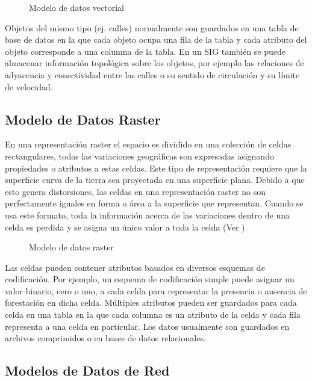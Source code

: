 \begin{figure}[h]
	\centering
	
	\caption{Modelo de datos vectorial}
	\label{fig:modelo-vectorial} 
\end{figure}

Objetos del mismo tipo (ej. calles) normalmente son guardados en una tabla de base de datos en la que cada objeto ocupa una fila de la tabla y cada atributo del objeto corresponde a una columna de la tabla. En un SIG también se puede almacenar información topológica sobre los objetos, por ejemplo las relaciones de adyacencia y conectividad entre las calles o su sentido de circulación y su límite de velocidad.

\subsection{Modelo de Datos Raster}

En una representación raster el espacio es dividido en una colección de celdas rectangulares, todas las variaciones geográficas son expresadas asignando propiedades o atributos a estas celdas. Este tipo de representación requiere que la superficie curva de la tierra sea proyectada en una superficie plana. Debido a que esto genera distorsiones, las celdas en una representación raster no son perfectamente iguales en forma o área a la superficie que representan. Cuando se usa este formato, toda la información acerca de las variaciones dentro de una celda es perdida y se asigna un único valor a toda la celda (Ver ).

\begin{figure}[h]
	\centering
	
	\caption{Modelo de datos raster}
	\label{fig:modelo-raster} 
\end{figure}

Las celdas pueden contener atributos basados en diversos esquemas de codificación. Por ejemplo, un esquema de codificación simple puede asignar un valor binario, cero o uno, a cada celda para representar la presencia o ausencia de forestación en dicha celda. Múltiples atributos pueden ser guardados para cada celda en una tabla en la que cada columna es un atributo de la celda y cada fila representa a una celda en particular. Los datos usualmente son guardados en archivos comprimidos o en bases de datos relacionales.

\subsection{Modelos de Datos de Red}

